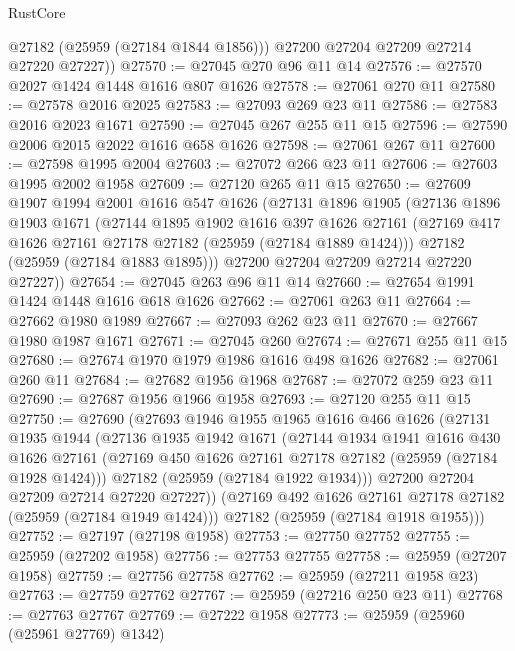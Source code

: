 \begin{lexlean}{RustCore}
\begin{coremodule}
          @27182
          (@25959 (@27184 @1844 @1856)))
        @27200
        @27204
        @27209
        @27214
        @27220
        @27227))
@27570 := @27045 @270 @96 @11 @14
@27576 := @27570 @2027 @1424 @1448 @1616 @807 @1626
@27578 := @27061 @270 @11
@27580 := @27578 @2016 @2025
@27583 := @27093 @269 @23 @11
@27586 := @27583 @2016 @2023 @1671
@27590 := @27045 @267 @255 @11 @15
@27596 := @27590 @2006 @2015 @2022 @1616 @658 @1626
@27598 := @27061 @267 @11
@27600 := @27598 @1995 @2004
@27603 := @27072 @266 @23 @11
@27606 := @27603 @1995 @2002 @1958
@27609 := @27120 @265 @11 @15
@27650 := @27609
    @1907
    @1994
    @2001
    @1616
    @547
    @1626
    (@27131
      @1896
      @1905
      (@27136
        @1896
        @1903
        @1671
        (@27144
          @1895
          @1902
          @1616
          @397
          @1626
          @27161
          (@27169 @417 @1626 @27161 @27178 @27182 (@25959 (@27184 @1889 @1424)))
          @27182
          (@25959 (@27184 @1883 @1895)))
        @27200
        @27204
        @27209
        @27214
        @27220
        @27227))
@27654 := @27045 @263 @96 @11 @14
@27660 := @27654 @1991 @1424 @1448 @1616 @618 @1626
@27662 := @27061 @263 @11
@27664 := @27662 @1980 @1989
@27667 := @27093 @262 @23 @11
@27670 := @27667 @1980 @1987 @1671
@27671 := @27045 @260
@27674 := @27671 @255 @11 @15
@27680 := @27674 @1970 @1979 @1986 @1616 @498 @1626
@27682 := @27061 @260 @11
@27684 := @27682 @1956 @1968
@27687 := @27072 @259 @23 @11
@27690 := @27687 @1956 @1966 @1958
@27693 := @27120 @255 @11 @15
@27750 := @27690
    (@27693
      @1946
      @1955
      @1965
      @1616
      @466
      @1626
      (@27131
        @1935
        @1944
        (@27136
          @1935
          @1942
          @1671
          (@27144
            @1934
            @1941
            @1616
            @430
            @1626
            @27161
            (@27169 @450 @1626 @27161 @27178 @27182 (@25959 (@27184 @1928 @1424)))
            @27182
            (@25959 (@27184 @1922 @1934)))
          @27200
          @27204
          @27209
          @27214
          @27220
          @27227))
      (@27169 @492 @1626 @27161 @27178 @27182 (@25959 (@27184 @1949 @1424)))
      @27182
      (@25959 (@27184 @1918 @1955)))
@27752 := @27197 (@27198 @1958)
@27753 := @27750 @27752
@27755 := @25959 (@27202 @1958)
@27756 := @27753 @27755
@27758 := @25959 (@27207 @1958)
@27759 := @27756 @27758
@27762 := @25959 (@27211 @1958 @23)
@27763 := @27759 @27762
@27767 := @25959 (@27216 @250 @23 @11)
@27768 := @27763 @27767
@27769 := @27222 @1958
@27773 := @25959 (@25960 (@25961 @27769) @1342)

\end{coremodule}
\end{lexlean}
